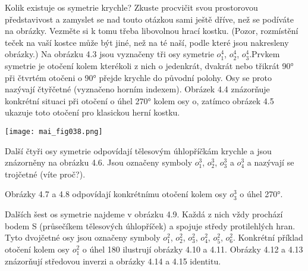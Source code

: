 \begin{example}
    Kolik existuje os symetrie krychle? Zkuste procvičit svou prostorovou představivost a zamyslet 
    se nad touto  otázkou sami ještě dříve, než se podíváte na obrázky. Vezměte si k tomu třeba 
    libovolnou hrací kostku. (Pozor, rozmístění teček na vaší kostce může být jiné, než na té naší, 
    podle které jsou nakresleny obrázky.) Na obrázku 4.3 jsou vyznačeny tři osy symetrie \(o_1^4\), 
    \(o_2^4\), \(o_3^4\).Prvkem symetrie je otočení kolem kterékoli z nich o jedenkrát, dvakrát 
    nebo třikrát \ang{90} při čtvrtém otočeni o \ang{90} přejde krychle do původní 
    polohy. Osy se proto nazývají čtyřčetné (vyznačeno horním indexem). Obrázek 4.4 znázorňuje 
    konkrétní situaci při otočení o úhel \ang{270} kolem osy o, zatímco obrázek 4.5 ukazuje 
    toto otočení pro klasickou herní kostku.

  {\centering
    \captionsetup{type=figure}
    \texttt{[image: mai\_fig038.png]}
    \par}  
  
    Další čtyři osy symetrie odpovídají tělesovým úhlopříčkám krychle a jsou znázorněny na obrázku 
    4.6. Jsou označeny symboly \(o_1^3\), \(o_2^3\), \(o_3^3\) a \(o_4^3\) a nazývají se trojčetné 
    (víte proč?).
    
    Obrázky 4.7 a 4.8 odpovídají konkrétnímu otočení kolem osy \(o_3^3\) o úhel \ang{270}.
    
    Dalších šest os symetrie najdeme v obrázku 4.9. Každá z nich vždy prochází bodem S (průsečíkem 
    tělesových úhlopříček) a spojuje středy protilehlých hran. Tyto dvojčetné osy jsou označeny 
    symboly \(o_1^2\), \(o_2^2\), \(o_3^2\), \(o_4^2\), \(o_5^2\), \(o_6^2\). Konkrétní příklad 
    otočení kolem osy \(o_1^2\) o úhel \SI{180}{\deg} ilustrují obrázky 4.10 a 4.11. Obrázky 4.12 a 
    4.13 znázorňují středovou inverzi a obrázky 4.14 a 4.15 identitu.
    

\end{example}
